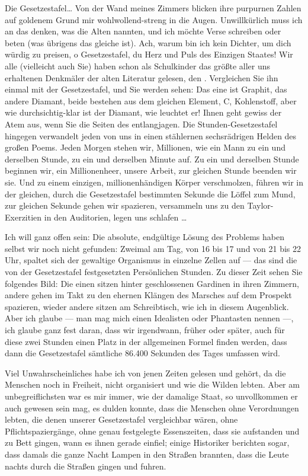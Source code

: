 Die Gesetzestafel\ldots{} Von der Wand meines Zimmers blicken ihre
purpurnen Zahlen auf goldenem Grund mir wohlwollend-streng in die
Augen. Unwillkürlich muss ich an das denken, was die Alten 
nannten, und ich möchte Verse schreiben oder beten (was übrigens
das gleiche ist). Ach, warum bin ich kein Dichter, um dich würdig
zu preisen, o Gesetzestafel, du Herz und Puls des Einzigen Staates!
Wir alle (vielleicht auch Sie) haben schon als Schulkinder das
größte aller uns erhaltenen Denkmäler der alten Literatur gelesen,
den . Vergleichen Sie ihn einmal mit der
Gesetzestafel, und Sie werden sehen: Das eine ist Graphit, das
andere Diamant, beide bestehen aus dem gleichen Element, C,
Kohlenstoff, aber wie durchsichtig-klar ist der Diamant, wie
leuchtet er! Ihnen geht gewiss der Atem aus, wenn Sie die Seiten
des  entlangjagen. Die Stunden-Gesetzestafel hingegen
verwandelt jeden von uns in einen stählernen sechsrädrigen Helden
des großen Poems. Jeden Morgen stehen wir, Millionen, wie ein Mann
zu ein und derselben Stunde, zu ein und derselben Minute auf. Zu
ein und derselben Stunde beginnen wir, ein Millionenheer, unsere
Arbeit, zur gleichen Stunde beenden wir sie. Und zu einem einzigen,
millionenhändigen Körper verschmolzen, führen wir in der gleichen,
durch die Gesetzestafel bestimmten Sekunde die Löffel zum Mund, zur
gleichen Sekunde gehen wir spazieren, versammeln uns zu den
Taylor-Exerzitien in den Auditorien, legen uns schlafen \ldots{}

Ich
will ganz offen sein: Die absolute, endgültige Lösung
des Problems  haben selbst wir noch nicht gefunden: Zweimal am
Tag, von 16 bis 17 und von 21 bis 22 Uhr, spaltet sich der
gewaltige Organismus in einzelne Zellen auf — das sind die von der
Gesetzestafel festgesetzten Persönlichen Stunden. Zu dieser Zeit
sehen Sie folgendes Bild: Die einen sitzen hinter geschlossenen
Gardinen in ihren Zimmern, andere gehen im Takt zu den ehernen
Klängen des Marsches auf dem Prospekt spazieren, wieder andere
sitzen am Schreibtisch, wie ich in diesem Augenblick. Aber ich
glaube — man mag mich einen Idealisten oder Phantasten nennen —,
ich glaube ganz fest daran, dass wir irgendwann, früher oder
später, auch für diese zwei Stunden einen Platz in der allgemeinen
Formel finden werden, dass dann die Gesetzestafel sämtliche 86.400
Sekunden des Tages umfassen wird.

Viel Unwahrscheinliches habe ich
von jenen Zeiten gelesen und gehört, da die Menschen noch in
Freiheit, nicht organisiert und wie die Wilden lebten. Aber am
unbegreiflichsten war es mir immer, wie der damalige Staat, so
unvollkommen er auch gewesen sein mag, es dulden konnte, dass die
Menschen ohne Verordnungen lebten, die denen unserer Gesetzestafel
vergleichbar wären, ohne Pflichtspaziergänge, ohne genau
festgelegte Essenszeiten, dass sie aufstanden und zu Bett gingen,
wann es ihnen gerade einfiel; einige Historiker berichten sogar,
dass damals die ganze Nacht Lampen in den Straßen brannten, dass
die Leute nachts durch die Straßen gingen und fuhren.

